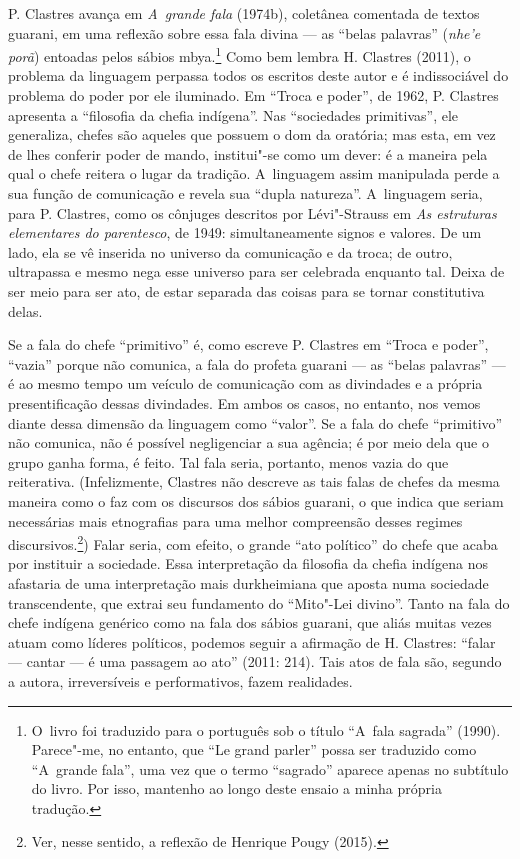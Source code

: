 P. Clastres avança em \emph{A~grande fala} (1974b), coletânea comentada de
textos guarani, em uma reflexão sobre essa fala divina --- as ``belas
palavras'' (\emph{nhe’e porã}) entoadas pelos sábios mbya.\footnote{O~livro foi
traduzido para o português sob o título ``A~fala sagrada'' (1990).
Parece"-me, no entanto, que ``Le grand parler'' possa ser traduzido como
``A~grande fala'', uma vez que o termo ``sagrado'' aparece apenas no
subtítulo do livro. Por isso, mantenho ao longo deste ensaio a minha
própria tradução.} Como bem lembra H. Clastres (2011), o problema da
linguagem perpassa todos os escritos deste autor e é indissociável do
problema do poder por ele iluminado. Em ``Troca e poder'', de 1962, P.
Clastres apresenta a ``filosofia da chefia indígena''. Nas ``sociedades
primitivas'', ele generaliza, chefes são aqueles que possuem o dom da
oratória; mas esta, em vez de lhes conferir poder de mando, institui"-se
como um dever: é a maneira pela qual o chefe reitera o lugar da
tradição. A~linguagem assim manipulada perde a sua função de
comunicação e revela sua ``dupla natureza''. A~linguagem seria, para P.
Clastres, como os cônjuges descritos por Lévi"-Strauss em \emph{As estruturas
elementares do parentesco}, de 1949: simultaneamente signos e valores.
De um lado, ela se vê inserida no universo da comunicação e da troca;
de outro, ultrapassa e mesmo nega esse universo para ser celebrada
enquanto tal. Deixa de ser meio para ser ato, de estar separada das
coisas para se tornar constitutiva delas. 

Se a fala do chefe ``primitivo'' é, como escreve P. Clastres em ``Troca e
poder'', ``vazia'' porque não comunica, a fala do profeta guarani --- as
``belas palavras'' --- é ao mesmo tempo um veículo de comunicação com as
divindades e a própria presentificação dessas divindades. Em ambos os
casos, no entanto, nos vemos diante dessa dimensão da linguagem como
``valor''. Se a fala do chefe ``primitivo'' não comunica, não é possível
negligenciar a sua agência; é por meio dela que o grupo ganha forma, é
feito. Tal fala seria, portanto, menos vazia do que reiterativa.
(Infelizmente, Clastres não descreve as tais falas de chefes da mesma
maneira como o faz com os discursos dos sábios guarani, o que indica
que seriam necessárias mais etnografias para uma melhor compreensão
desses regimes discursivos.\footnote{Ver, nesse sentido, a reflexão de
Henrique Pougy (2015).}) Falar seria, com efeito, o grande ``ato
político'' do chefe que acaba por instituir a sociedade. Essa
interpretação da filosofia da chefia indígena nos afastaria de uma
interpretação mais durkheimiana que aposta numa sociedade
transcendente, que extrai seu fundamento do ``Mito"-Lei divino''. Tanto na
fala do chefe indígena genérico como na fala dos sábios guarani, que
aliás muitas vezes atuam como líderes políticos, podemos seguir a
afirmação de H. Clastres: ``falar --- cantar --- é uma passagem ao ato''
(2011: 214). Tais atos de fala são, segundo a autora, irreversíveis e
performativos, fazem realidades. 

